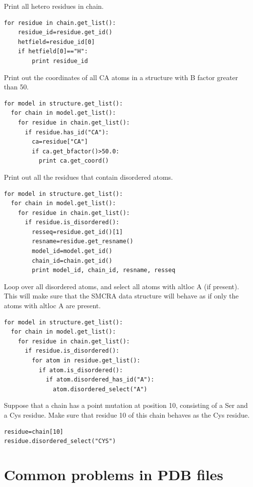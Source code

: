 \documentclass{report}
\begin{document}
Print all hetero residues in chain.

\begin{verbatim}
for residue in chain.get_list():
	residue_id=residue.get_id()
	hetfield=residue_id[0]
	if hetfield[0]=="H":
		print residue_id
\end{verbatim}

Print out the coordinates of all CA atoms in a structure with B factor greater
than 50.

\begin{verbatim}
for model in structure.get_list():
  for chain in model.get_list():
    for residue in chain.get_list():
      if residue.has_id("CA"):
        ca=residue["CA"]
        if ca.get_bfactor()>50.0:
          print ca.get_coord()
\end{verbatim}

Print out all the residues that contain disordered atoms.

\begin{verbatim}
for model in structure.get_list():
  for chain in model.get_list():
    for residue in chain.get_list():
      if residue.is_disordered():
        resseq=residue.get_id()[1]
        resname=residue.get_resname()
        model_id=model.get_id()
        chain_id=chain.get_id()
        print model_id, chain_id, resname, resseq
\end{verbatim}

Loop over all disordered atoms, and select all atoms with altloc A (if present).
This will make sure that the SMCRA data structure will behave as if only the
atoms with altloc A are present.

\begin{verbatim}
for model in structure.get_list():
  for chain in model.get_list():
    for residue in chain.get_list():
      if residue.is_disordered():
        for atom in residue.get_list():
          if atom.is_disordered():
            if atom.disordered_has_id("A"):
              atom.disordered_select("A")
\end{verbatim}

Suppose that a chain has a point mutation at position 10, consisting of a Ser
and a Cys residue. Make sure that residue 10 of this chain behaves as the Cys
residue.

\begin{verbatim}
residue=chain[10]
residue.disordered_select("CYS")
\end{verbatim}

\section{Common problems in PDB files}
\end{document}
